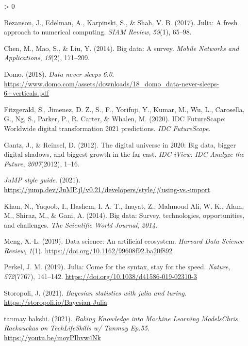 \documentclass[
  notoc %
]{tufte-book}
\newlength{\cslhangindent}
\newenvironment{CSLReferences}[2] %
 {%
  \setlength{\parindent}{0pt}
  \ifodd #1 \everypar{\setlength{\hangindent}{\cslhangindent}}\ignorespaces\fi
  \ifnum #2 > 0
  \setlength{\parskip}{#2\baselineskip}
  \fi
 }%
 {}
\begin{document}
\hypertarget{refs}{}
\begin{CSLReferences}{1}{0}
\leavevmode\hypertarget{ref-bezanson2017julia}{}%
Bezanson, J., Edelman, A., Karpinski, S., \& Shah, V. B. (2017). Julia:
{A} fresh approach to numerical computing. \emph{SIAM Review},
\emph{59}(1), 65--98.

\leavevmode\hypertarget{ref-chen2014big}{}%
Chen, M., Mao, S., \& Liu, Y. (2014). Big data: A survey. \emph{Mobile
Networks and Applications}, \emph{19}(2), 171--209.

\leavevmode\hypertarget{ref-domo2018data}{}%
Domo. (2018). \emph{Data never sleeps 6.0}.
\url{https://www.domo.com/assets/downloads/18_domo_data-never-sleeps-6+verticals.pdf}

\leavevmode\hypertarget{ref-fitzgerald2020idc}{}%
Fitzgerald, S., Jimenez, D. Z., S., F., Yorifuji, Y., Kumar, M., Wu, L.,
Carosella, G., Ng, S., Parker, P., R. Carter, \& Whalen, M. (2020). IDC
FutureScape: Worldwide digital transformation 2021 predictions.
\emph{IDC FutureScape}.

\leavevmode\hypertarget{ref-gantz2012digital}{}%
Gantz, J., \& Reinsel, D. (2012). The digital universe in 2020: Big
data, bigger digital shadows, and biggest growth in the far east.
\emph{IDC iView: IDC Analyze the Future}, \emph{2007}(2012), 1--16.

\leavevmode\hypertarget{ref-jump2021using}{}%
\emph{JuMP style guide}. (2021).
\url{https://jump.dev/JuMP.jl/v0.21/developers/style/\#using-vs.-import}

\leavevmode\hypertarget{ref-khan2014big}{}%
Khan, N., Yaqoob, I., Hashem, I. A. T., Inayat, Z., Mahmoud Ali, W. K.,
Alam, M., Shiraz, M., \& Gani, A. (2014). Big data: Survey,
technologies, opportunities, and challenges. \emph{The Scientific World
Journal}, \emph{2014}.

\leavevmode\hypertarget{ref-Meng2019Data}{}%
Meng, X.-L. (2019). Data science: An artificial ecosystem. \emph{Harvard
Data Science Review}, \emph{1}(1).
\url{https://doi.org/10.1162/99608f92.ba20f892}

\leavevmode\hypertarget{ref-perkelJuliaComeSyntax2019}{}%
Perkel, J. M. (2019). Julia: Come for the syntax, stay for the speed.
\emph{Nature}, \emph{572}(7767), 141--142.
\url{https://doi.org/10.1038/d41586-019-02310-3}

\leavevmode\hypertarget{ref-storopoli2021bayesianjulia}{}%
Storopoli, J. (2021). \emph{Bayesian statistics with julia and turing}.
\url{https://storopoli.io/Bayesian-Julia}

\leavevmode\hypertarget{ref-tanmaybakshiBakingKnowledgeMachine2021}{}%
tanmay bakshi. (2021). \emph{Baking {Knowledge} into {Machine Learning
Models}{{Chris Rackauckas}} on {TechLifeSkills} w/ {Tanmay Ep}.55}.
\url{https://youtu.be/moyPIhvw4Nk}


\end{CSLReferences}
\end{document}
